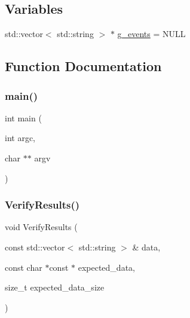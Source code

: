 \subsection*{Variables}
\begin{DoxyCompactItemize}
\item 
std\+::vector$<$ std\+::string $>$ $\ast$ \mbox{\hyperlink{googletest-listener-test_8cc_a32a264046f3603db11e6fcdaea5fb094}{g\+\_\+events}} = N\+U\+LL
\end{DoxyCompactItemize}


\subsection{Function Documentation}
\mbox{\label{googletest-listener-test_8cc_a3c04138a5bfe5d72780bb7e82a18e627}} 
\subsubsection{\texorpdfstring{main()}{main()}}
{\footnotesize\ttfamily int main (\begin{DoxyParamCaption}\item[{int}]{argc,  }\item[{char $\ast$$\ast$}]{argv }\end{DoxyParamCaption})}

\mbox{\label{googletest-listener-test_8cc_ab9d583cd17d35925ad3d12f864d57fe9}} 
\subsubsection{\texorpdfstring{VerifyResults()}{VerifyResults()}}
{\footnotesize\ttfamily void Verify\+Results (\begin{DoxyParamCaption}\item[{const std\+::vector$<$ std\+::string $>$ \&}]{data,  }\item[{const char $\ast$const $\ast$}]{expected\+\_\+data,  }\item[{size\+\_\+t}]{expected\+\_\+data\+\_\+size }\end{DoxyParamCaption})}



